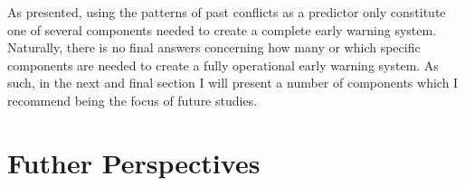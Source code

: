 \documentclass[a4paper]{article}
\begin{document}
As presented, using the patterns of past conflicts as a predictor only constitute one of several components needed to create a complete early warning system. Naturally, there is no final answers concerning how many or which specific components are needed to create a fully operational early warning system. As such, in the next and final section I will present a number of components which I recommend being the focus of future studies.\par



\section{Futher Perspectives}









\end{document}
